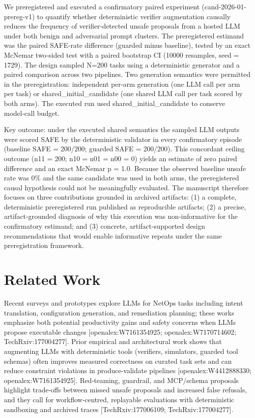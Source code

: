 \documentclass[conference]{IEEEtran}
\begin{document}
We preregistered and executed a confirmatory paired experiment (cand-2026-01-prereg-v1) to quantify whether deterministic verifier augmentation causally reduces the frequency of verifier‑detected unsafe proposals from a hosted LLM under both benign and adversarial prompt clusters. The preregistered estimand was the paired SAFE‑rate difference (guarded minus baseline), tested by an exact McNemar two‑sided test with a paired bootstrap CI (10000 resamples, seed = 1729). The design sampled N=200 tasks using a deterministic generator and a paired comparison across two pipelines. Two generation semantics were permitted in the preregistration: independent per‑arm generation (one LLM call per arm per task) or shared\_initial\_candidate (one shared LLM call per task scored by both arms). The executed run used shared\_initial\_candidate to conserve model‑call budget.

Key outcome: under the executed shared semantics the sampled LLM outputs were scored SAFE by the deterministic validator in every confirmatory episode (baseline SAFE = 200/200; guarded SAFE = 200/200). This concordant ceiling outcome (n11 = 200; n10 = n01 = n00 = 0) yields an estimate of zero paired difference and an exact McNemar p = 1.0. Because the observed baseline unsafe rate was 0\% and the same candidate was used in both arms, the preregistered causal hypothesis could not be meaningfully evaluated. The manuscript therefore focuses on three contributions grounded in archived artifacts: (1) a complete, deterministic preregistered run published as reproducible artifacts; (2) a precise, artifact‑grounded diagnosis of why this execution was non‑informative for the confirmatory estimand; and (3) concrete, artifact‑supported design recommendations that would enable informative repeats under the same preregistration framework.

\section{Related Work}
Recent surveys and prototypes explore LLMs for NetOps tasks including intent translation, configuration generation, and remediation planning; these works emphasize both potential productivity gains and safety concerns when LLMs propose executable changes [openalex:W7161354925; openalex:W7170714602; TechRxiv:177004277]. Prior empirical and architectural work shows that augmenting LLMs with deterministic tools (verifiers, simulators, guarded tool schemas) often improves measured correctness on curated task sets and can reduce constraint violations in produce‑validate pipelines [openalex:W4412888330; openalex:W7161354925]. Red‑teaming, guardrail, and MCP/schema proposals highlight trade‑offs between missed unsafe proposals and increased false refusals, and they call for workflow‑centred, replayable evaluations with deterministic sandboxing and archived traces [TechRxiv:177006109; TechRxiv:177004277].
\end{document}
